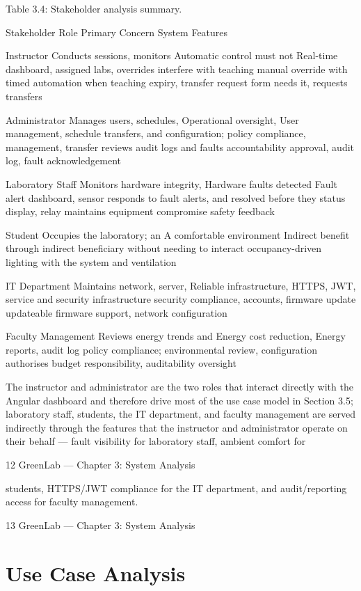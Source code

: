 Table 3.4: Stakeholder analysis summary.

Stakeholder Role Primary Concern System Features

Instructor Conducts sessions, monitors Automatic control must not Real-time dashboard,
assigned labs, overrides interfere with teaching manual override with timed
automation when teaching expiry, transfer request form
needs it, requests transfers

Administrator Manages users, schedules, Operational oversight, User management, schedule
transfers, and configuration; policy compliance, management, transfer
reviews audit logs and faults accountability approval, audit log, fault
acknowledgement

Laboratory Staff Monitors hardware integrity, Hardware faults detected Fault alert dashboard, sensor
responds to fault alerts, and resolved before they status display, relay
maintains equipment compromise safety feedback

Student Occupies the laboratory; an A comfortable environment Indirect benefit through
indirect beneficiary without needing to interact occupancy-driven lighting
with the system and ventilation

IT Department Maintains network, server, Reliable infrastructure, HTTPS, JWT, service
and security infrastructure security compliance, accounts, firmware update
updateable firmware support, network
configuration

Faculty Management Reviews energy trends and Energy cost reduction, Energy reports, audit log
policy compliance; environmental review, configuration
authorises budget responsibility, auditability oversight

The instructor and administrator are the two roles that interact directly with the Angular dashboard
and therefore drive most of the use case model in Section 3.5; laboratory staff, students, the IT
department, and faculty management are served indirectly through the features that the instructor
and administrator operate on their behalf --- fault visibility for laboratory staff, ambient comfort for

12
GreenLab --- Chapter 3: System Analysis


students, HTTPS/JWT compliance for the IT department, and audit/reporting access for faculty
management.




13
GreenLab --- Chapter 3: System Analysis



\section{Use Case Analysis}

